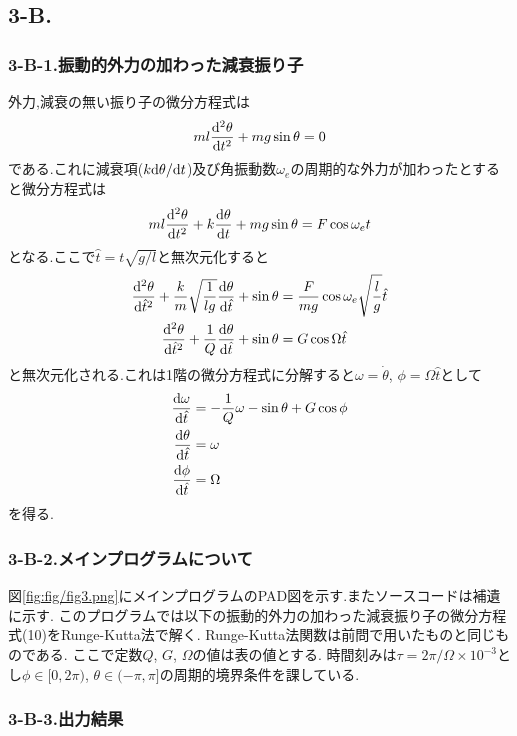 \subsection*{3-B.}
\subsubsection*{3-B-1.振動的外力の加わった減衰振り子}
外力,減衰の無い振り子の微分方程式は
\begin{align}
  ml\frac{{\rm d}^2\theta}{{\rm d}t^2}+mg\sin \theta=0
\end{align}
である.これに減衰項($k{\rm d}\theta/{\rm d}t$)及び角振動数$\omega_e$の周期的な外力が加わったとすると微分方程式は
\begin{align}
  ml\frac{{\rm d}^2\theta}{{\rm d}t^2}+k\frac{{\rm d}\theta}{{\rm d}t}+mg\sin \theta=F\cos\omega_et
\end{align}
となる.ここで$\hat{t}=t\sqrt{g/l}$と無次元化すると
\begin{align}
  \begin{split}
    \frac{{\rm d}^2\theta}{{\rm d}\hat{t}^2}+\frac{k}{m}\sqrt{\frac{1}{lg}}\frac{{\rm d}\theta}{{\rm d}\hat{t}}+\sin\theta&=\frac{F}{mg}\cos\omega_e\sqrt{\frac{l}{g}}\hat{t}\\
    \frac{{\rm d}^2\theta}{{\rm d}\hat{t}^2}+\frac{1}{Q}\frac{{\rm d}\theta}{{\rm d}\hat{t}}+\sin\theta&=G\cos\Omega\hat{t}
  \end{split}
\end{align}
と無次元化される.これは1階の微分方程式に分解すると$\omega=\dot{\theta}$, $\phi=\Omega\hat{t}$として
\begin{align}
  \begin{split}
    \frac{{\rm d}\omega}{{\rm d}\hat{t}}&=-\frac{1}{Q}\omega-\sin\theta+G\cos\phi\\
    \frac{{\rm d}\theta}{{\rm d}\hat{t}}&=\omega\\
    \frac{{\rm d}\phi}{{\rm d}\hat{t}}&=\Omega
  \end{split}
\end{align}
を得る.
\subsubsection*{3-B-2.メインプログラムについて}
図\ref{fig:fig/fig3.png}にメインプログラムのPAD図を示す.またソースコードは補遺に示す.
このプログラムでは以下の振動的外力の加わった減衰振り子の微分方程式(10)をRunge-Kutta法で解く.
Runge-Kutta法関数は前問で用いたものと同じものである.
ここで定数$Q$, $G$, $\Omega$の値は表の値とする.
時間刻みは$\tau=2\pi/\Omega\times10^{-3}$とし$\phi\in[0,2\pi)$, $\theta\in(-\pi,\pi]$の周期的境界条件を課している.
\subsubsection*{3-B-3.出力結果}
\newpage
{}
